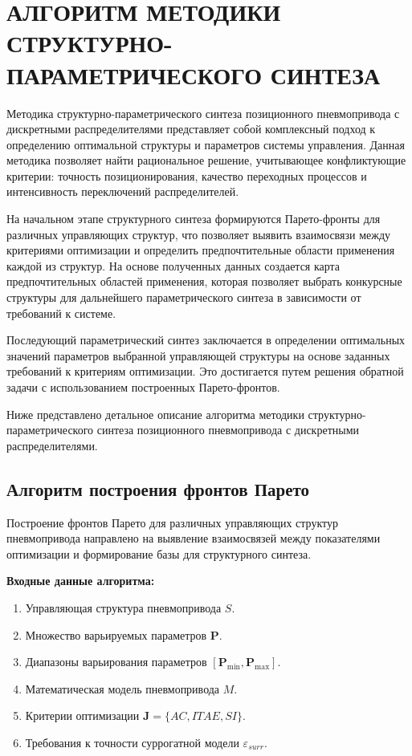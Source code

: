 \chapter{АЛГОРИТМ МЕТОДИКИ СТРУКТУРНО-ПАРАМЕТРИЧЕСКОГО СИНТЕЗА}\label{app:methodology}

Методика структурно-параметрического синтеза позиционного пневмопривода с дискретными распределителями
представляет собой комплексный подход к определению оптимальной структуры и параметров системы управления. Данная методика
позволяет найти рациональное решение, учитывающее конфликтующие критерии: точность позиционирования, качество переходных
процессов и интенсивность переключений распределителей.

На начальном этапе структурного синтеза формируются Парето-фронты для различных управляющих
структур, что позволяет выявить взаимосвязи между критериями оптимизации и определить предпочтительные области
применения каждой из структур. На основе полученных данных создается карта предпочтительных областей применения,
которая позволяет выбрать конкурсные структуры для дальнейшего параметрического синтеза в зависимости
от требований к системе.

Последующий параметрический синтез заключается в определении оптимальных значений параметров выбранной управляющей
структуры на основе заданных требований к критериям оптимизации. Это достигается путем решения обратной
задачи с использованием построенных Парето-фронтов.

Ниже представлено детальное описание алгоритма методики структурно-параметрического
синтеза позиционного пневмопривода с дискретными распределителями.


\section*{Алгоритм построения фронтов Парето}

Построение фронтов Парето для различных управляющих структур пневмопривода направлено на
выявление взаимосвязей между показателями оптимизации и формирование базы для структурного синтеза.

\textbf{Входные данные алгоритма:}
\begin{enumerate}
    \item Управляющая структура пневмопривода $S$.
    \item Множество варьируемых параметров $\mathbf{P}$.
    \item Диапазоны варьирования параметров $[\mathbf{P}_{\min}, \mathbf{P}_{\max}]$.
    \item Математическая модель пневмопривода $M$.
    \item Критерии оптимизации $\mathbf{J} = \{AC, ITAE, SI\}$.
    \item Требования к точности суррогатной модели $\varepsilon_{surr}$.
\end{enumerate}

